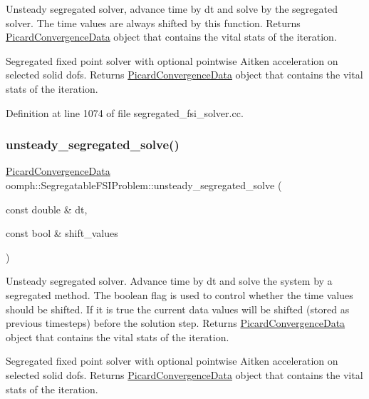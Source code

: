Unsteady segregated solver, advance time by dt and solve by the segregated solver. The time values are always shifted by this function. Returns \hyperlink{classoomph_1_1PicardConvergenceData}{Picard\+Convergence\+Data} object that contains the vital stats of the iteration. 

Segregated fixed point solver with optional pointwise Aitken acceleration on selected solid dofs. Returns \hyperlink{classoomph_1_1PicardConvergenceData}{Picard\+Convergence\+Data} object that contains the vital stats of the iteration. 

Definition at line 1074 of file segregated\+\_\+fsi\+\_\+solver.\+cc.

\mbox{\label{classoomph_1_1SegregatableFSIProblem_a17f019ebaf83e170219bf605a8554111}} 
\subsubsection{\texorpdfstring{unsteady\+\_\+segregated\+\_\+solve()}{unsteady\_segregated\_solve()}\hspace{0.1cm}{\footnotesize\ttfamily [2/2]}}
{\footnotesize\ttfamily \hyperlink{classoomph_1_1PicardConvergenceData}{Picard\+Convergence\+Data} oomph\+::\+Segregatable\+F\+S\+I\+Problem\+::unsteady\+\_\+segregated\+\_\+solve (\begin{DoxyParamCaption}\item[{const double \&}]{dt,  }\item[{const bool \&}]{shift\+\_\+values }\end{DoxyParamCaption})}



Unsteady segregated solver. Advance time by dt and solve the system by a segregated method. The boolean flag is used to control whether the time values should be shifted. If it is true the current data values will be shifted (stored as previous timesteps) before the solution step. Returns \hyperlink{classoomph_1_1PicardConvergenceData}{Picard\+Convergence\+Data} object that contains the vital stats of the iteration. 

Segregated fixed point solver with optional pointwise Aitken acceleration on selected solid dofs. Returns \hyperlink{classoomph_1_1PicardConvergenceData}{Picard\+Convergence\+Data} object that contains the vital stats of the iteration. 

